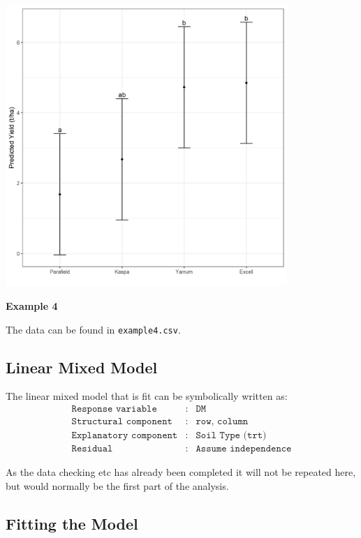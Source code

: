 \documentclass[a4paper, 10pt, fleqn, twosided]{memoir}
\begin{document}
\begin{tcolorbox}[title = Example 3 Graph of predicted values]
\includegraphics[width=0.8\textwidth, frame]{Example3LMMPred.png}
\end{tcolorbox}

\clearpage
\textbf{Example 4}

The data can be found in  \texttt{example4.csv}.

\subsection{Linear Mixed Model}
The linear mixed model that is fit can be symbolically written as:
\begin{eqnarray*}
	\texttt{Response variable}&:& \texttt{DM} \\
	\texttt{Structural component}&:& \texttt{row, column}\\
	\texttt{Explanatory component}&:& \texttt{Soil Type (trt)}\\
	\texttt{Residual}&:& \texttt{Assume independence}
\end{eqnarray*}

As the data checking etc has already been completed it will not be repeated here, but would normally be the first part
of the analysis.

\subsection{Fitting the Model}
\end{document}
